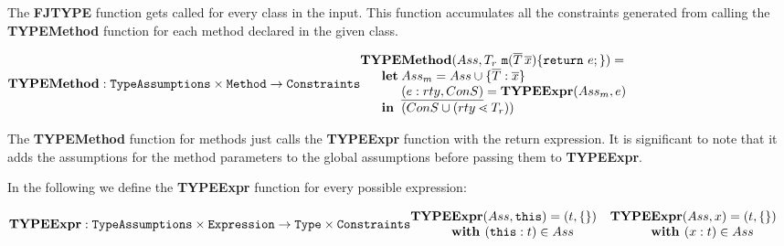 \documentclass[acmsmall,screen,review]{acmart}
\begin{document}
The \textbf{FJTYPE} function gets called for every class in the input.
This function accumulates all the constraints generated from calling the
\textbf{TYPEMethod} function for each method declared in the given class.

$\textbf{TYPEMethod}:\texttt{TypeAssumptions} \times
\texttt{Method} \rightarrow \texttt{Constraints}\\
\begin{array}{@{}l@{}l@{}l}
\textbf{TY}& \textbf{PE} & \textbf{Method} (Ass, T_r \ \mathtt{m}(\overline{T} \, \overline{x})\{ \mathtt{ return }\ e; \}) =\\
& \textbf{let}
& Ass_m = Ass \cup \{ \overline{T} : \overline{x} \}\\
& & \ul{(e:rty, ConS)} = \textbf{TYPEExpr}(Ass_m, e)\\
& \mathbf{in}
& (ConS \cup (rty \lessdot T_r))\\
\end{array}
$

The \textbf{TYPEMethod} function for methods just calls the \textbf{TYPEExpr} function with the
return expression. It is significant to note that it adds the assumptions for the method parameters to the global assumptions before passing them to \textbf{TYPEExpr}.

\smallskip

In the following we define the \textbf{TYPEExpr} function for every possible expression:

\smallskip

$\textbf{TYPEExpr}:\texttt{TypeAssumptions} \times
\texttt{Expression} \rightarrow \texttt{Type} \times \texttt{Constraints}\\
\begin{array}{@{}l@{}l}
\textbf{TY} \textbf{PE} & \textbf{Expr} (Ass, \mathtt{this}) = (t , \{\})\\
& \textbf{with } (\mathtt{this} : t) \in Ass 
\end{array}
$
\smallskip
$\begin{array}{@{}l@{}l}
\textbf{TY} \textbf{PE} & \textbf{Expr} (Ass,x) = (t , \{\})\\
& \textbf{with } (x : t) \in Ass 
\end{array}
$

\smallskip
\end{document}
